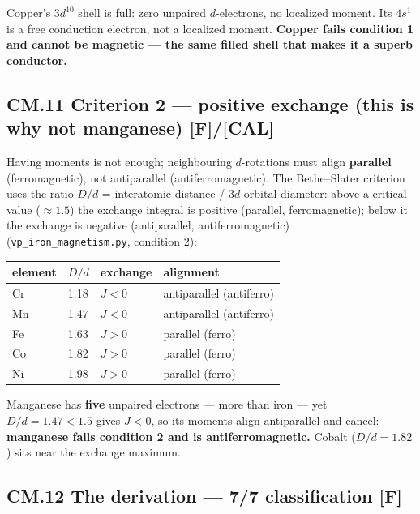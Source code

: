 \documentclass[
  10pt,
]{article}
\begin{document}
Copper's \(3d^{10}\) shell is full: zero unpaired \(d\)-electrons, no
localized moment. Its \(4s^1\) is a free conduction electron, not a
localized moment. \textbf{Copper fails condition 1 and cannot be
magnetic --- the same filled shell that makes it a superb conductor.}

\hypertarget{cm.11-criterion-2-positive-exchange-this-is-why-not-manganese-fcal}{%
\subsection{\texorpdfstring{CM.11 Criterion 2 --- positive exchange
(this is why \textbf{not manganese})
\textbf{{[}F{]}/{[}CAL{]}}}{CM.11 Criterion 2 --- positive exchange (this is why not manganese) {[}F{]}/{[}CAL{]}}}\label{cm.11-criterion-2-positive-exchange-this-is-why-not-manganese-fcal}}

Having moments is not enough; neighbouring \(d\)-rotations must align
\textbf{parallel} (ferromagnetic), not antiparallel (antiferromagnetic).
The Bethe--Slater criterion uses the ratio \(D/d\) = interatomic
distance / \(3d\)-orbital diameter: above a critical value
(\(\approx 1.5\)) the exchange integral is positive (parallel,
ferromagnetic); below it the exchange is negative (antiparallel,
antiferromagnetic) (\texttt{vp\_iron\_magnetism.py}, condition 2):

\begin{longtable}[]{@{}llll@{}}
\toprule\noalign{}
element & \(D/d\) & exchange & alignment \\
\midrule\noalign{}
\endhead
\bottomrule\noalign{}
\endlastfoot
Cr & 1.18 & \(J<0\) & antiparallel (antiferro) \\
Mn & 1.47 & \(J<0\) & antiparallel (antiferro) \\
Fe & 1.63 & \(J>0\) & parallel (ferro) \\
Co & 1.82 & \(J>0\) & parallel (ferro) \\
Ni & 1.98 & \(J>0\) & parallel (ferro) \\
\end{longtable}

Manganese has \textbf{five} unpaired electrons --- more than iron ---
yet \(D/d = 1.47 < 1.5\) gives \(J<0\), so its moments align
antiparallel and cancel: \textbf{manganese fails condition 2 and is
antiferromagnetic.} Cobalt (\(D/d = 1.82\)) sits near the exchange
maximum.

\hypertarget{cm.12-the-derivation-77-classification-f}{%
\subsection{\texorpdfstring{CM.12 The derivation --- 7/7 classification
\textbf{{[}F{]}}}{CM.12 The derivation --- 7/7 classification {[}F{]}}}\label{cm.12-the-derivation-77-classification-f}}
\end{document}
